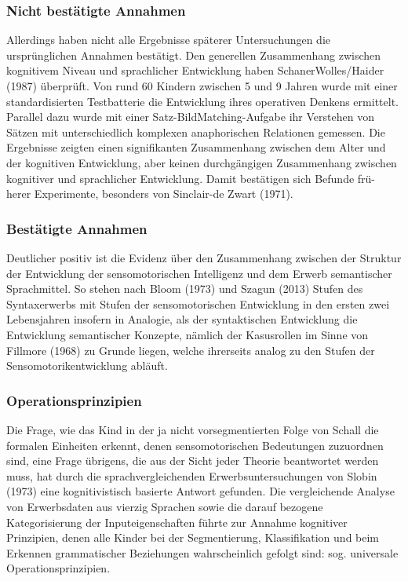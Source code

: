 \documentclass[
  letterpaper,
]{scrbook}
\begin{document}
\hypertarget{nicht-bestuxe4tigte-annahmen}{%
\subsubsection{Nicht bestätigte
Annahmen}\label{nicht-bestuxe4tigte-annahmen}}

Allerdings haben nicht alle Ergebnisse späterer Untersuchungen die
ursprünglichen Annahmen bestätigt. Den generellen Zusammenhang zwischen
kognitivem Niveau und sprachlicher Entwicklung haben
SchanerWolles/Haider (1987) überprüft. Von rund 60 Kindern zwischen 5
und 9 Jahren wurde mit einer standardisierten Testbatterie die
Entwicklung ihres operativen Denkens ermittelt. Parallel dazu wurde mit
einer Satz-BildMatching-Aufgabe ihr Verstehen von Sätzen mit
unterschiedlich komplexen anaphorischen Relationen gemessen. Die
Ergebnisse zeigten einen signifikanten Zusammenhang zwischen dem Alter
und der kognitiven Entwicklung, aber keinen durchgängigen Zusammenhang
zwischen kognitiver und sprachlicher Entwicklung. Damit bestätigen sich
Befunde frü- herer Experimente, besonders von Sinclair-de Zwart (1971).

\hypertarget{bestuxe4tigte-annahmen}{%
\subsubsection{Bestätigte Annahmen}\label{bestuxe4tigte-annahmen}}

Deutlicher positiv ist die Evidenz über den Zusammenhang zwischen der
Struktur der Entwicklung der sensomotorischen Intelligenz und dem Erwerb
semantischer Sprachmittel. So stehen nach Bloom (1973) und Szagun (2013)
Stufen des Syntaxerwerbs mit Stufen der sensomotorischen Entwicklung in
den ersten zwei Lebensjahren insofern in Analogie, als der syntaktischen
Entwicklung die Entwicklung semantischer Konzepte, nämlich der
Kasusrollen im Sinne von Fillmore (1968) zu Grunde liegen, welche
ihrerseits analog zu den Stufen der Sensomotorikentwicklung abläuft.

\hypertarget{operationsprinzipien}{%
\subsubsection{Operationsprinzipien}\label{operationsprinzipien}}

Die Frage, wie das Kind in der ja nicht vorsegmentierten Folge von
Schall die formalen Einheiten erkennt, denen sensomotorischen
Bedeutungen zuzuordnen sind, eine Frage übrigens, die aus der Sicht
jeder Theorie beantwortet werden muss, hat durch die
sprachvergleichenden Erwerbsuntersuchungen von Slobin (1973) eine
kognitivistisch basierte Antwort gefunden. Die vergleichende Analyse von
Erwerbsdaten aus vierzig Sprachen sowie die darauf bezogene
Kategorisierung der Inputeigenschaften führte zur Annahme kognitiver
Prinzipien, denen alle Kinder bei der Segmentierung, Klassifikation und
beim Erkennen grammatischer Beziehungen wahrscheinlich gefolgt sind:
sog. universale Operationsprinzipien.\\
\end{document}
